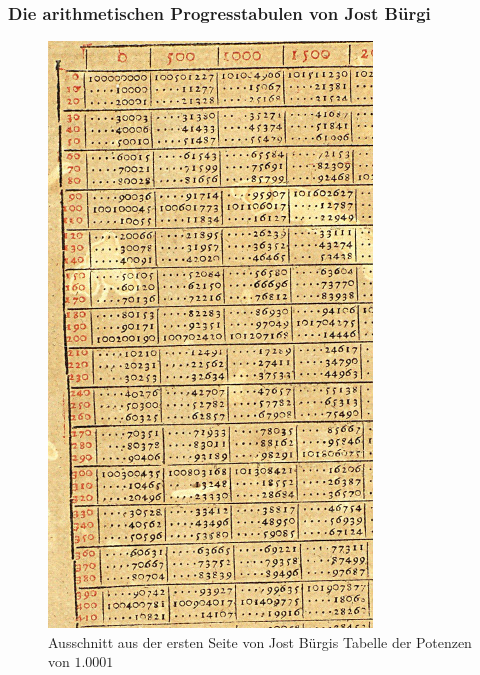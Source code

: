 \subsubsection{Die arithmetischen Progresstabulen von Jost Bürgi}
\begin{figure}
\centering
\includegraphics{chapters/020-exponential/images/Log_Calc-Figure7.jpeg}
\caption{Ausschnitt aus der ersten Seite von Jost Bürgis Tabelle der
Potenzen von $1.0001$
\label{buch:exponential:log:fig:buergi1}}
\end{figure}
